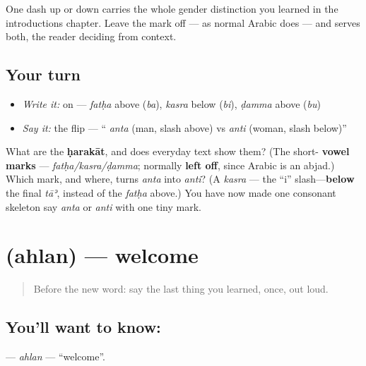 One dash up or down carries the whole gender distinction you learned in the introductions chapter. Leave the mark off — as normal Arabic does — and \textbf{} serves both, the reader deciding from context.

\subsection*{Your turn}
\begin{itemize}
\raggedright
  \item \emph{Write it:} on \textbf{} — \emph{fatḥa} above (\emph{ba}), \emph{kasra} below (\emph{bi}), \emph{ḍamma} above (\emph{bu})
  \item \emph{Say it:} the flip — \textquotedblleft{} \emph{anta} (man, slash above) vs  \emph{anti} (woman, slash below)\textquotedblright{}
\end{itemize}

\begin{tcolorbox}[breakable,colback=teal!4,colframe=teal!35!black,title={Before you move on}]
What are the \textbf{ḥarakāt}, and does everyday text show them? (The short- \textbf{vowel marks} — \emph{fatḥa/kasra/ḍamma}; normally \textbf{left off}, since Arabic is an abjad.) Which mark, and where, turns \emph{anta} into \emph{anti}? (A \emph{kasra} — the \textquotedblleft{}i\textquotedblright{} slash—\textbf{below} the final \emph{tāʾ}, instead of the \emph{fatḥa} above.) You have now made one consonant skeleton say \emph{anta} or \emph{anti} with one tiny mark.
\end{tcolorbox}
\section[\texorpdfstring{\ar{أَهْلًا} (ahlan)}{أَهْلًا (ahlan)}]{ (ahlan) — welcome}

\label{lesson:AR-C02-ahlan}



\begin{quote}
Before the new word: say the last thing you learned, once, out loud.
\end{quote}

\subsection*{You'll want to know: }
\textbf{} — \emph{ahlan} — \textquotedblleft{}welcome\textquotedblright{}.

